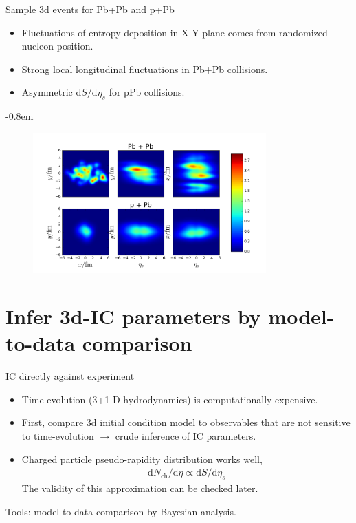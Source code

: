 \documentclass[11pt]{beamer}
\begin{document}
\begin{frame}{Sample 3d events for Pb+Pb and p+Pb}
\begin{itemize}
\item Fluctuations of entropy deposition in X-Y plane comes from randomized nucleon position.
\item Strong local longitudinal fluctuations in Pb+Pb collisions.
\item Asymmetric $\mathrm{d}S/\mathrm{d}\eta_s$ for pPb collisions.
\end{itemize}
\kern-0.8em
\begin{figure}
\begin{center}
\includegraphics[width = 0.8\textwidth]{./pics/3d-example.png}
\end{center}
\end{figure}
\end{frame}


\section{Infer 3d-IC parameters by model-to-data comparison}
\begin{frame}{IC directly against experiment}
\begin{itemize}
\item Time evolution (3+1 D hydrodynamics) is computationally expensive.
\item First, compare 3d initial condition model to observables that are not sensitive to time-evolution $\rightarrow$ crude inference of IC parameters.
\item Charged particle pseudo-rapidity distribution works well,
\begin{eqnarray}
\nonumber
\mathrm{d}N_{\textrm{ch}}/\mathrm{d}\eta \propto \mathrm{d}S/\mathrm{d}\eta_s
\end{eqnarray}
The validity of this approximation can be checked later.
\end{itemize}
\color{red} Tools: model-to-data comparison by Bayesian analysis.
\end{frame}
\end{document}
